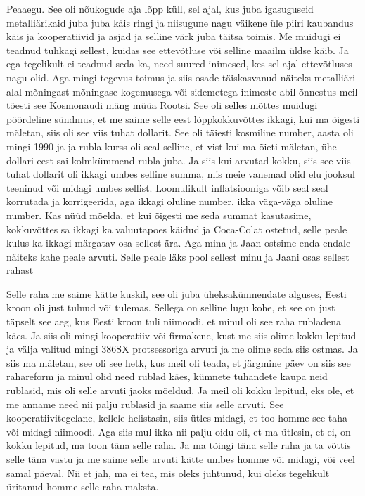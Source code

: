 Peaaegu. See oli nõukogude aja lõpp küll, sel ajal, kus juba igasuguseid 
metalliärikaid juba juba käis ringi ja niisugune nagu väikene üle piiri  
kaubandus käis ja kooperatiivid ja asjad ja selline värk juba täitsa toimis. Me 
muidugi ei teadnud tuhkagi sellest, kuidas  see  ettevõtluse või selline maailm 
üldse käib. Ja ega tegelikult ei teadnud seda ka, need suured inimesed, kes sel 
ajal ettevõtluses nagu  olid. Aga mingi tegevus toimus ja siis osade  
täiskasvanud näiteks metalliäri alal mõningast mõningase kogemusega või 
sidemetega inimeste abil õnnestus meil tõesti see Kosmonaudi mäng müüa Rootsi. 
See oli selles mõttes muidugi pöördeline sündmus, et me saime selle eest 
lõppkokkuvõttes ikkagi, kui ma õigesti mäletan, siis oli see viis tuhat 
dollarit. See oli täiesti kosmiline number,  aasta oli mingi 1990 ja ja  rubla 
kurss oli seal selline, et vist kui ma õieti mäletan, ühe dollari eest sai 
kolmkümmend rubla juba. Ja siis kui arvutad kokku, siis see viis tuhat dollarit 
oli ikkagi umbes selline summa, mis meie vanemad olid elu jooksul teeninud või 
midagi umbes sellist. Loomulikult inflatsiooniga võib seal seal korrutada ja 
korrigeerida, aga ikkagi  oluline number, ikka väga-väga oluline number. Kas 
nüüd mõelda, et kui õigesti me seda summat  kasutasime, kokkuvõttes sa ikkagi 
ka valuutapoes käidud ja Coca-Colat ostetud, selle peale kulus ka ikkagi 
märgatav osa sellest ära. Aga mina ja Jaan ostsime enda endale näiteks kahe 
peale arvuti. Selle peale läks pool sellest  minu ja Jaani osas sellest rahast 


Selle raha me saime kätte kuskil, see oli juba üheksakümnendate alguses,  Eesti 
kroon oli just tulnud või tulemas. Sellega on selline lugu kohe, et see on just 
täpselt see aeg, kus Eesti kroon tuli niimoodi, et minul oli see raha rubladena 
käes. Ja siis oli mingi kooperatiiv või firmakene, kust me siis olime kokku 
lepitud ja välja valitud mingi 386SX protsessoriga arvuti ja me olime seda siis 
ostmas. Ja siis ma mäletan, see oli see hetk, kus meil oli teada, et järgmine 
päev on siis see rahareform ja minul olid need rublad käes, kümnete tuhandete 
kaupa neid rublasid, mis oli selle arvuti jaoks mõeldud. Ja meil oli kokku 
lepitud, eks ole, et me anname need nii palju rublasid ja saame siis selle 
arvuti. See kooperatiivitegelane, kellele helistasin, siis ütles midagi, et too 
homme see taha või midagi niimoodi. Aga siis mul ikka nii palju oidu oli, et ma 
ütlesin, et ei, on kokku lepitud, ma toon täna selle raha. Ja ma tõingi täna 
selle raha ja ta võttis selle täna vastu ja me saime selle arvuti kätte umbes 
homme või midagi, või veel samal päeval. Nii et jah, ma ei tea, mis oleks 
juhtunud, kui oleks tegelikult üritanud homme selle raha  maksta. 

